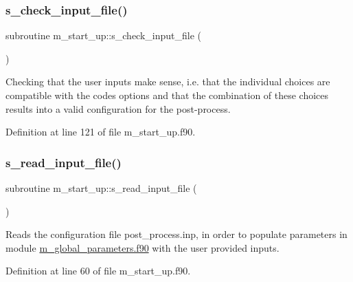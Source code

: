 \subsubsection{\texorpdfstring{s\+\_\+check\+\_\+input\+\_\+file()}{s\_check\_input\_file()}}
{\footnotesize\ttfamily subroutine m\+\_\+start\+\_\+up\+::s\+\_\+check\+\_\+input\+\_\+file (\begin{DoxyParamCaption}{ }\end{DoxyParamCaption})}



Checking that the user inputs make sense, i.\+e. that the individual choices are compatible with the code\textquotesingle{}s options and that the combination of these choices results into a valid configuration for the post-\/process. 



Definition at line 121 of file m\+\_\+start\+\_\+up.\+f90.

\mbox{\label{namespacem__start__up_a3a19eb11ae434dc590a1bd7835442891}} 
\subsubsection{\texorpdfstring{s\+\_\+read\+\_\+input\+\_\+file()}{s\_read\_input\_file()}}
{\footnotesize\ttfamily subroutine m\+\_\+start\+\_\+up\+::s\+\_\+read\+\_\+input\+\_\+file (\begin{DoxyParamCaption}{ }\end{DoxyParamCaption})}



Reads the configuration file post\+\_\+process.\+inp, in order to populate parameters in module \hyperlink{m__global__parameters_8f90}{m\+\_\+global\+\_\+parameters.\+f90} with the user provided inputs. 



Definition at line 60 of file m\+\_\+start\+\_\+up.\+f90.

